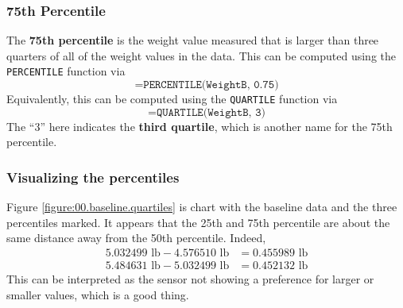 \subsubsection{75th Percentile}
The \textbf{75th percentile} is the weight value measured that is larger than three quarters of all of the weight values in the data. This can be computed using the \texttt{PERCENTILE} function via
\begin{equation}
    \texttt{=PERCENTILE(WeightB, 0.75)}
\end{equation}
Equivalently, this can be computed using the \texttt{QUARTILE} function via
\begin{equation}
    \texttt{=QUARTILE(WeightB, 3)}
\end{equation}
The ``3'' here indicates the \textbf{third quartile}, which is another name for the 75th percentile.
\subsubsection{Visualizing the percentiles}
Figure \ref{figure:00.baseline.quartiles} is chart with the baseline data and the three percentiles marked. It appears that the 25th and 75th percentile are about the same distance away from the 50th percentile. Indeed,
\begin{align}
    5.032499\text{ lb} - 4.576510\text{ lb} &= 0.455989 \text{ lb} \\
    5.484631\text{ lb} - 5.032499\text{ lb} &= 0.452132 \text{ lb}
\end{align}
This can be interpreted as the sensor not showing a preference for larger or smaller values, which is a good thing.

